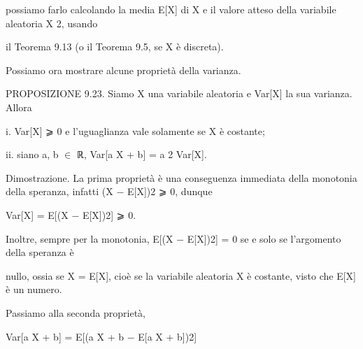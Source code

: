 \documentclass[a4paper,portrait,12pt]{article}
\begin{document}
\begin{flushleft}
possiamo farlo calcolando la media E[X] di X e il valore atteso della variabile aleatoria X 2, usando
\end{flushleft}


\begin{flushleft}
il Teorema 9.13 (o il Teorema 9.5, se X \`{e} discreta).
\end{flushleft}


\begin{flushleft}
Possiamo ora mostrare alcune propriet\`{a} della varianza.
\end{flushleft}


\begin{flushleft}
PROPOSIZIONE 9.23. Siamo X una variabile aleatoria e Var[X] la sua varianza. Allora
\end{flushleft}


\begin{flushleft}
i. Var[X] ⩾ 0 e l'uguaglianza vale solamente se X \`{e} costante;
\end{flushleft}


\begin{flushleft}
ii. siano a, b $\in$ ℝ, Var[a X + b] = a 2 Var[X].
\end{flushleft}


\begin{flushleft}
Dimostrazione. La prima propriet\`{a} \`{e} una conseguenza immediata della monotonia della speranza, infatti (X $-$ E[X])2 ⩾ 0, dunque
\end{flushleft}


\begin{flushleft}
Var[X] = E[(X $-$ E[X])2] ⩾ 0.
\end{flushleft}


\begin{flushleft}
Inoltre, sempre per la monotonia, E[(X $-$ E[X])2] = 0 se e solo se l'argomento della speranza \`{e}
\end{flushleft}


\begin{flushleft}
nullo, ossia se X = E[X], cio\`{e} se la variabile aleatoria X \`{e} costante, visto che E[X] \`{e} un numero.
\end{flushleft}


\begin{flushleft}
Passiamo alla seconda propriet\`{a},
\end{flushleft}


\begin{flushleft}
Var[a X + b] = E[(a X + b $-$ E[a X + b])2]
\end{flushleft}
\end{document}
